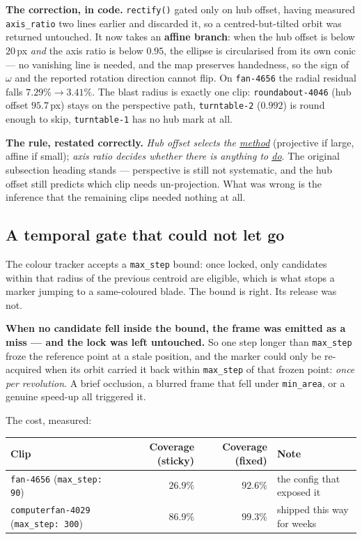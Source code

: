 \documentclass[11pt,a4paper]{article}
\begin{document}
\textbf{The correction, in code.} \texttt{rectify()} gated only on hub offset, having measured
\texttt{axis\_ratio} two lines earlier and discarded it, so a centred-but-tilted orbit was
returned untouched. It now takes an \textbf{affine branch}: when the hub offset is below
$20$\,px \emph{and} the axis ratio is below $0.95$, the ellipse is circularised from its own
conic --- no vanishing line is needed, and the map preserves handedness, so the sign of $\omega$
and the reported rotation direction cannot flip. On \texttt{fan-4656} the radial residual falls
$7.29\% \to 3.41\%$. The blast radius is exactly one clip: \texttt{roundabout-4046} (hub offset
$95.7$\,px) stays on the perspective path, \texttt{turntable-2} ($0.992$) is round enough to skip,
\texttt{turntable-1} has no hub mark at all.

\textbf{The rule, restated correctly.} \emph{Hub offset selects the \underline{method}}
(projective if large, affine if small); \emph{axis ratio decides whether there is anything to
\underline{do}}. The original subsection heading stands --- perspective is still not systematic,
and the hub offset still predicts which clip needs un-projection. What was wrong is the inference
that the remaining clips needed nothing at all.

\subsection{A temporal gate that could not let go}
\label{sec:stickylock}

The colour tracker accepts a \texttt{max\_step} bound: once locked, only candidates within that
radius of the previous centroid are eligible, which is what stops a marker jumping to a
same-coloured blade. The bound is right. Its release was not.

\textbf{When no candidate fell inside the bound, the frame was emitted as a miss --- and the lock
was left untouched.} So one step longer than \texttt{max\_step} froze the reference point at a
stale position, and the marker could only be re-acquired when its orbit carried it back within
\texttt{max\_step} of that frozen point: \emph{once per revolution}. A brief occlusion, a blurred
frame that fell under \texttt{min\_area}, or a genuine speed-up all triggered it.

The cost, measured:

\begin{center}
\footnotesize
\begin{tabular}{lrrl}
\toprule
Clip & Coverage (sticky) & Coverage (fixed) & Note \\
\midrule
\texttt{fan-4656} (\texttt{max\_step: 90}) & $26.9\%$ & $\mathbf{92.6\%}$ & the config that exposed it \\
\texttt{computerfan-4029} (\texttt{max\_step: 300}) & $86.9\%$ & $\mathbf{99.3\%}$ & shipped this way for weeks \\
\bottomrule
\end{tabular}
\end{center}
\end{document}
